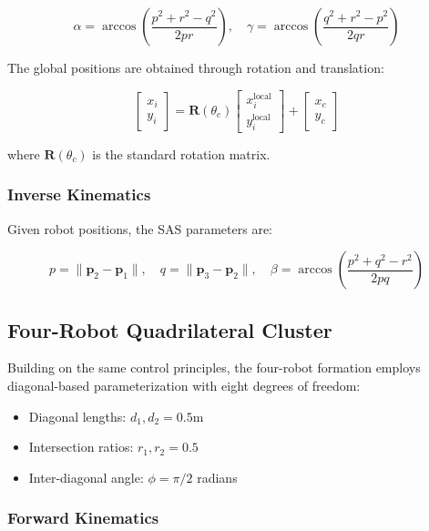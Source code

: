 \documentclass{article}
\begin{document}
\begin{equation}
\alpha = \arccos\left(\frac{p^2 + r^2 - q^2}{2pr}\right), \quad
\gamma = \arccos\left(\frac{q^2 + r^2 - p^2}{2qr}\right)
\end{equation}

The global positions are obtained through rotation and translation:

\begin{equation}
\begin{bmatrix} x_i \\ y_i \end{bmatrix} = 
\mathbf{R}(\theta_c)\begin{bmatrix} x_i^{\text{local}} \\ y_i^{\text{local}} \end{bmatrix} +
\begin{bmatrix} x_c \\ y_c \end{bmatrix}
\end{equation}

where $\mathbf{R}(\theta_c)$ is the standard rotation matrix.

\subsubsection{Inverse Kinematics}

Given robot positions, the SAS parameters are:

\begin{equation}
p = \|\mathbf{p}_2 - \mathbf{p}_1\|, \quad q = \|\mathbf{p}_3 - \mathbf{p}_2\|, \quad
\beta = \arccos\left(\frac{p^2 + q^2 - r^2}{2pq}\right)
\end{equation}

\subsection{Four-Robot Quadrilateral Cluster}

Building on the same control principles, the four-robot formation employs diagonal-based parameterization with eight degrees of freedom:
\begin{itemize}
\item Diagonal lengths: $d_1, d_2 = 0.5$m
\item Intersection ratios: $r_1, r_2 = 0.5$
\item Inter-diagonal angle: $\phi = \pi/2$ radians
\end{itemize}

\subsubsection{Forward Kinematics}
\end{document}
